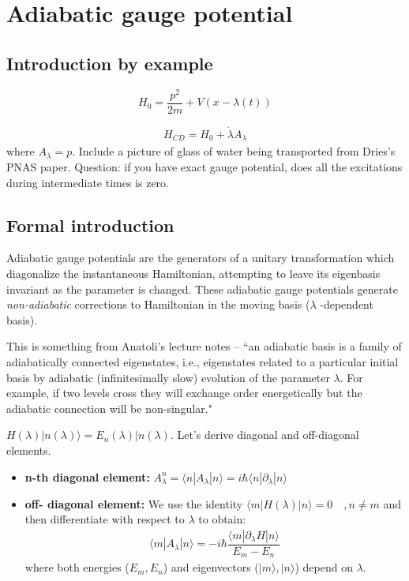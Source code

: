 \documentclass[11pt,a4paper]{article}
\begin{document}
\section{Adiabatic gauge potential}
\subsection{Introduction by example}


\begin{equation}
H_0= \dfrac{p^2}{2m} + V(x- \lambda(t))
\end{equation}

\begin{align*}
H_{CD}= H_0 + \dot{\lambda} A_{\lambda}
\end{align*}
where $A_{\lambda}= p$.
Include a picture of glass of water being transported from Dries's PNAS paper. Question: if you have exact gauge potential, does all the excitations during intermediate times is zero.

\subsection{Formal introduction}
Adiabatic gauge potentials are the generators of a unitary transformation which diagonalize the instantaneous Hamiltonian, attempting to leave its eigenbasis invariant as the parameter is changed. These adiabatic gauge potentials generate \textit{non-adiabatic} corrections to Hamiltonian in the moving basis ($\lambda$ -dependent basis).
 
 This is something from Anatoli's lecture notes \cite{kolodrubetz2016geometry}--
``an adiabatic basis is a family of adiabatically connected eigenstates, i.e., eigenstates related
to a particular initial basis by adiabatic (infinitesimally slow) evolution of the parameter $\lambda$. For example, if two levels cross they will exchange order energetically but the adiabatic connection will be non-singular."


$H (\lambda) |n(\lambda) \rangle = E_n (\lambda) |n(\lambda) $. Let's derive diagonal and off-diagonal elements. 


\begin{itemize}
\item \textbf{n-th diagonal element:} $A_{\lambda}^n= \langle n |A_{\lambda} | n \rangle=  i \hbar\langle n |\partial_{\lambda} | n \rangle $
\item \textbf{off- diagonal element:} We use the identity $\langle m |H(\lambda) | n \rangle=0 \quad, n \neq m$ and then differentiate with respect to $\lambda$ to obtain:
\begin{align}
\boxed{\langle m |A_{\lambda} | n \rangle =  -i \hbar \dfrac{\langle m |\partial_{\lambda}H | n \rangle}{E_m-E_n}}
\end{align}
where both  energies ($E_m, E_n$) and eigenvectors ($|m \rangle, |n \rangle$) depend on $\lambda$.
\end{itemize}
\end{document}
